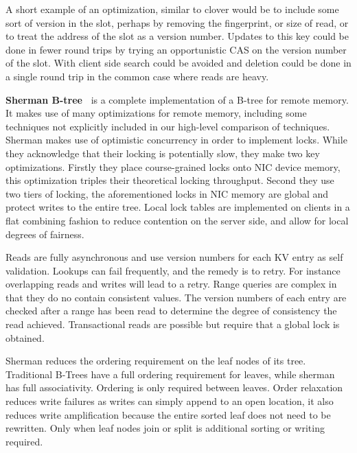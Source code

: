 A short example of an optimization, similar to clover would be to include some
sort of version in the slot, perhaps by removing the fingerprint, or size of
read, or to treat the address of the slot as a version number. Updates to this
key could be done in fewer round trips by trying an opportunistic CAS on the
version number of the slot. With client side search could be avoided and
deletion could be done in a single round trip in the common case where reads are
heavy.



\textbf{Sherman B-tree~\cite{sherman}}
is a complete implementation of a B-tree for remote memory.  It makes use of
many optimizations for remote memory, including some techniques not explicitly
included in our high-level comparison of techniques. Sherman makes use of
optimistic concurrency in order to implement locks. While they acknowledge that
their locking is potentially slow, they make two key optimizations. Firstly they
place course-grained locks onto NIC device memory, this optimization triples
their theoretical locking throughput. Second they use two tiers of locking, the
aforementioned locks in NIC memory are global and protect writes to the entire
tree. Local lock tables are implemented on clients in a flat combining fashion
to reduce contention on the server side, and allow for local degrees of
fairness.

Reads are fully asynchronous and use version numbers for each KV entry as self
validation. Lookups can fail frequently, and the remedy is to retry.  For
instance overlapping reads and writes will lead to a retry. Range queries are
complex in that they do no contain consistent values. The version numbers of
each entry are checked after a range has been read to determine the degree of
consistency the read achieved. Transactional reads are possible but require that
a global lock is obtained.

Sherman reduces the ordering requirement on the leaf nodes of its tree.
Traditional B-Trees have a full ordering requirement for leaves, while sherman
has full associativity. Ordering is only required between leaves. Order
relaxation reduces write failures as writes can simply append to an open
location, it also reduces write amplification because the entire sorted leaf
does not need to be rewritten. Only when leaf nodes join or split is additional
sorting or writing required.


